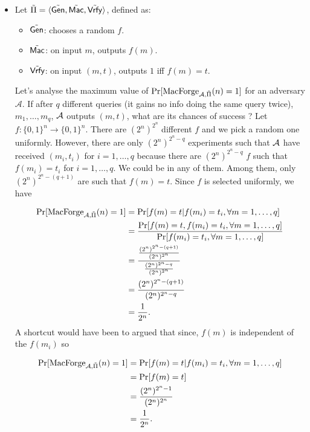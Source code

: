 \newape

\begin{solution}
  \begin{itemize}
    \item
      Let $\tilde{\Pi} = \langle \tilde{\operatorname{\mathsf{Gen}}}, \tilde{\operatorname{\mathsf{Mac}}}, \tilde{\operatorname{\mathsf{Vrfy}}} \rangle$, defined as:
      \begin{itemize}
        \item $\tilde{\operatorname{\mathsf{Gen}}}$: chooses a random $f$.
        \item $\tilde{\operatorname{\mathsf{Mac}}}$: on input $m$, outputs $f(m)$.
        \item $\tilde{\operatorname{\mathsf{Vrfy}}}$: on input $(m,t)$, outputs $1$ iff $f(m) = t$.
      \end{itemize}

      Let's analyse the maximum value of $\Pr[\operatorname{MacForge}_{\mathcal{A}, \tilde{\Pi}}(n) = 1]$ for an adversary $\mathcal{A}$.
      If after $q$ different queries (it gains no info doing the same query twice),
      $m_1, \ldots, m_q$, $\mathcal{A}$ outputs $(m, t)$, what are its chances of success ?
      Let $f:\{0,1\}^n \to \{0,1\}^n$.
      There are $(2^n)^{2^n}$ different $f$ and we pick a random one uniformly.
      However, there are only $(2^n)^{2^n-q}$ experiments such that $\mathcal{A}$ have received $(m_i,t_i)$ for $i = 1, \ldots, q$ because
      there are $(2^n)^{2^n-q}$ $f$ such that $f(m_i) = t_i$ for $i = 1, \ldots, q$.
      We could be in any of them.
      Among them, only $(2^n)^{2^n-(q+1)}$ are such that $f(m) = t$.
      Since $f$ is selected uniformly, we have

      \begin{align*}
        \Pr[\operatorname{MacForge}_{\mathcal{A}, \tilde{\Pi}}(n) = 1]
        & = \Pr[f(m) = t | f(m_i) = t_i, \forall m = 1, \ldots, q]\\
        & = \frac{\Pr[f(m) = t, f(m_i) = t_i, \forall m = 1, \ldots, q]}{\Pr[f(m_i) = t_i, \forall m = 1, \ldots, q]}\\
        & = \frac{\frac{(2^n)^{2^n-(q+1)}}{(2^n)^{2^n}}}{\frac{(2^n)^{2^n-q}}{(2^n)^{2^n}}}\\
        & = \frac{(2^n)^{2^n-(q+1)}}{(2^n)^{2^n-q}}\\
        & = \frac{1}{2^n}.
      \end{align*}
      A shortcut would have been to argued that since, $f(m)$ is independent of the $f(m_i)$ so

      \begin{align*}
        \Pr[\operatorname{MacForge}_{\mathcal{A}, \tilde{\Pi}}(n) = 1]
        & = \Pr[f(m) = t | f(m_i) = t_i, \forall m = 1, \ldots, q]\\
        & = \Pr[f(m) = t]\\
        & = \frac{(2^n)^{2^n-1}}{(2^n)^{2^n}}\\
        & = \frac{1}{2^n}.
      \end{align*}


\end{itemize}
\end{solution}
